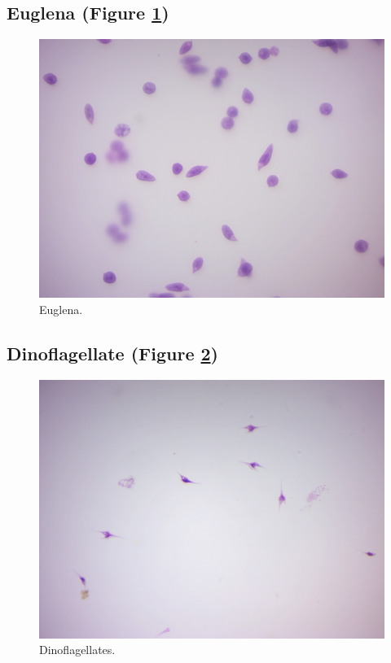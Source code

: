 \subsection{Euglena (Figure
\ref{fig:euglenaprepared})}\label{euglena-figure-reffigeuglenaprepared}

\begin{figure}

{\centering \includegraphics[width=0.7\linewidth]{./figures/protists/Euglena_prepared} 

}

\caption{Euglena.}\label{fig:euglenaprepared}
\end{figure}

\subsection{Dinoflagellate (Figure
\ref{fig:dinoflagellateprepared})}\label{dinoflagellate-figure-reffigdinoflagellateprepared}

\begin{figure}

{\centering \includegraphics[width=0.7\linewidth]{./figures/protists/Dinoflagellates_prepared} 

}

\caption{Dinoflagellates.}\label{fig:dinoflagellateprepared}
\end{figure}

